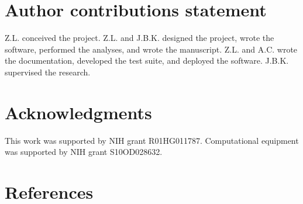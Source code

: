 \documentclass[twoside]{kinney_lab_preprintstyle}
\begin{document}
\section*{Author contributions statement}
Z.L. conceived the project. Z.L. and J.B.K. designed the project, wrote the software, performed the analyses, and wrote the manuscript. Z.L. and A.C. wrote the documentation, developed the test suite, and deployed the software. J.B.K. supervised the research.

\section*{Acknowledgments}
This work was supported by NIH grant R01HG011787. Computational equipment was supported by NIH grant S10OD028632.

\section*{References}

\end{document}
